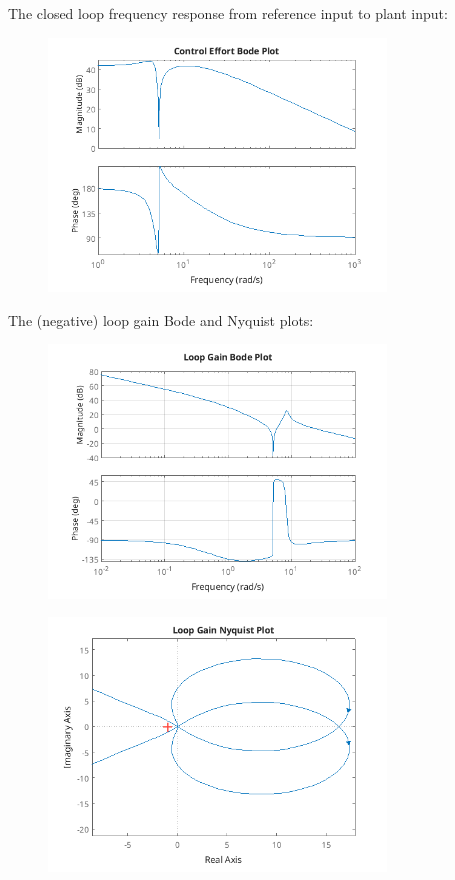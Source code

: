 \documentclass{article}
\begin{document}
The closed loop frequency response from reference input to plant input:

\begin{figure}[H]
\centering
\includegraphics[width=0.8\textwidth]{r2pFreqResp.png}
\label{fig:r2pFreqResp}
\end{figure}

The (negative) loop gain Bode and Nyquist plots:

\begin{figure}[H]
\centering
\includegraphics[width=0.8\textwidth]{loopGainFreqResp.png}
\label{fig:loopGainFreqResp}
\end{figure}

\begin{figure}[H]
\centering
\includegraphics[width=0.8\textwidth]{loopGainNyquist.png}
\label{fig:loopGainNyquist}
\end{figure}
\end{document}
